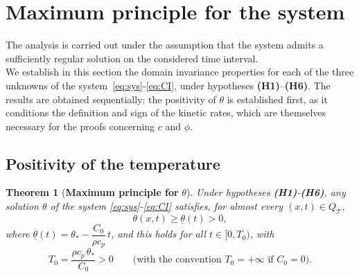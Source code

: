\documentclass[final,1p,times]{elsarticle}
\numberwithin{equation}{section}
\newtheorem{theorem}{Theorem}[section]
\newcommand{\QT}{Q_{\mathcal{T}}}
\begin{document}
	
	\section{Maximum principle for the system}
	\label{sec:max}
	The analysis is carried out under the assumption that the system admits a sufficiently regular solution on the considered time interval.\\
\indent	We establish in this section the domain invariance properties for each of the three unknowns of the system~\eqref{eq:sys}-\eqref{eq:CI}, under hypotheses \textbf{(H1)}--\textbf{(H6)}. The results are obtained sequentially: the positivity of $\theta$ is established first, as it conditions the definition and sign of the kinetic rates, which are themselves necessary for the proofs concerning $c$ and $\phi$.
	
	\subsection{Positivity of the temperature}
	\label{sub:theta}
	
	\begin{theorem}[\textbf{Maximum principle for} $\theta$]
		\label{thm:theta_pos}
		Under hypotheses \textup{\textbf{(H1)}}-\textup{\textbf{(H6)}}, any solution $\theta$ of the system \eqref{eq:sys}-\eqref{eq:CI} satisfies, for almost every $(x,t) \in \QT$,
		\[
		\theta(x,t) \geq \underline{\theta}(t) > 0,
		\]
		where $\underline{\theta}(t) = \theta_* - \dfrac{C_0}{\rho c_p}\,t$, and this holds for all
		$t \in [0, T_0)$, with
		\[
		T_0 = \frac{\rho c_p\,\theta_*}{C_0} > 0
		\qquad\bigl(\text{with the convention } T_0 = +\infty \text{ if } C_0 = 0\bigr).
		\]
	\end{theorem}
	
\end{document}

